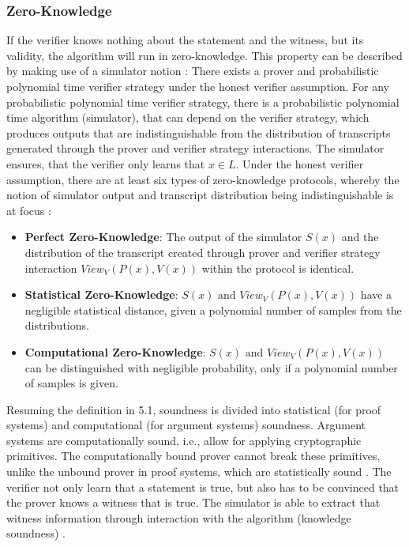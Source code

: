 \subsubsection{Zero-Knowledge}
If the verifier knows nothing about the statement and the witness, but its validity, the algorithm will run in zero-knowledge. This property can be described by making use of a simulator notion \citep{Thaler}: There exists a prover and probabilistic polynomial time verifier strategy under the honest verifier assumption. For any probabilistic polynomial time verifier strategy, there is a probabilistic polynomial time algorithm (simulator), that can depend on the verifier strategy, which produces outputs that are indistinguishable from the distribution of transcripts generated through the prover and verifier strategy interactions. The simulator ensures, that the verifier only learns that \(x \in L\). Under the honest verifier assumption, there are at least six types of zero-knowledge protocols, whereby the notion of simulator output and transcript distribution being indistinguishable is at focus \citep{zktypes}:
\begin{itemize}
    \item \textbf{Perfect Zero-Knowledge}: The output of the simulator \(S(x)\) and the distribution of the transcript created through prover and verifier strategy interaction \(View_V(P(x), V(x))\) within the protocol is identical. 
    \item \textbf{Statistical Zero-Knowledge}: \(S(x) \text{ and } View_V(P(x), V(x))\) have a negligible statistical distance, given a polynomial number of samples from the distributions.
    \item \textbf{Computational Zero-Knowledge}: \(S(x) \text{ and } View_V(P(x), V(x))\) can be distinguished with negligible probability, only if a polynomial number of samples is given.
\end{itemize}
Resuming the definition in 5.1, soundness is divided into statistical (for proof systems) and computational (for argument systems) soundness. Argument systems are computationally sound, i.e., allow for applying cryptographic primitives. The computationally bound prover cannot break these primitives, unlike the unbound prover in proof systems, which are statistically sound \citep{Thaler}. The verifier not only learn that a statement is true, but also has to be convinced that the prover knows a witness that is true. The simulator is able to extract that witness information through interaction with the algorithm (knowledge soundness) \citep{NitulescuGentleIntroSNARKs}.

